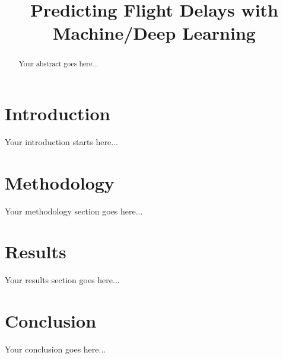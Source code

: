\documentclass[conference]{IEEEtran}
\begin{document}
\title{Predicting Flight Delays with Machine/Deep Learning}

\author{
}

\maketitle

\begin{abstract}
Your abstract goes here...
\end{abstract}

\section{Introduction}
Your introduction starts here...

\section{Methodology}
Your methodology section goes here...

\section{Results}
Your results section goes here...

\section{Conclusion}
Your conclusion goes here...
\end{document}
